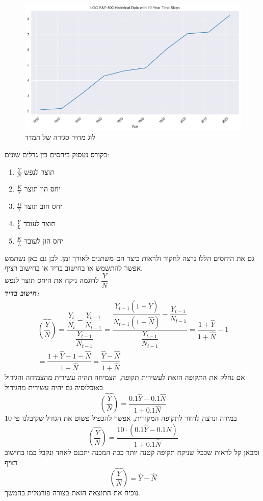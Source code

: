 \documentclass[a4paper,12pt]{article}
\begin{document}
\begin{RTL}
\begin{hebrew}
\begin{figure}[H]
    \centering
    \includegraphics[width=1\linewidth]{LOG S&P500.png}
    \caption{לוג מחיר סגירה של המדד}
\end{figure}
בקורס נעסוק ביחסים בין גדלים שונים:
\begin{enumerate}
    \item $\frac{Y}{N}$ תוצר לנפש
    \item $\frac{K}{Y}$ יחס הון תוצר
    \item $\frac{D}{Y}$ יחס חוב תוצר
    \item $\frac{Y}{L}$ תוצר לעובד
    \item $\frac{K}{L}$ יחס הון לעובד
\end{enumerate}
גם את היחסים הללו נרצה לחקור ולראות כיצד הם משתנים לאורך זמן. לכן גם כאן נשתמש אפשר להתשמש או בחישוב בדיד או בחישוב רציף.
\\
לדוגמה ניקח את היחס תוצר לנפש $\dfrac{Y}{N}$ \\
\textbf{\textit{חישוב בדיד:}}
\begin{multline*}
\widehat{\left(\dfrac{{Y}}{N}\right)} =\dfrac{\dfrac{Y_t}{N_t}-\dfrac{Y_{t-1}}{N_{t-1}}}{\dfrac{Y_{t-1}}{N_{t-1}}}=\dfrac{\dfrac{Y_{t-1}(1+\widehat{Y})}{N_{t-1}(1+\widehat{N})}-\dfrac{Y_{t-1}}{N_{t-1}}}{\dfrac{Y_{t-1}}{N_{t-1}}}=\dfrac{1+\widehat{Y}}{1+\widehat{N}}-1 \\
= \dfrac{1+\widehat{Y}-1-\widehat{N}}{1+\widehat{N}}=\dfrac{\widehat{Y}-\widehat{N}}{1+\widehat{N}}
\end{multline*}
אם נחלק את התקופה הזאת לעשירית תקופה, הצמיחה תהיה עשירית מהצמיחה והגידול באוכלוסיה גם יהיה עשירית מהגידול
\begin{equation*}
    \widehat{\left(\frac{Y}{N}\right)}
    = \dfrac{0.1\widehat Y - 0.1 \widehat N} {1 + 0.1\widehat N}
\end{equation*}
במידה ונרצה לחזור לתקופה המקורית, אפשר להכפיל פשוט את הגודל שקיבלנו פי 10
\begin{equation*}
    \widehat{\left(\frac{Y}{N}\right)}
    = \dfrac{10\cdot(0.1\widehat Y - 0.1 \widehat N)} {1 + 0.1\widehat N}
\end{equation*}
ומכאן קל לראות שככל שניקח תקופה קטנה יותר ככה המכנה יתכנס לאחד ונקבל כמו בחישוב רציף
\begin{equation*}
    \widehat{\left(\frac{Y}{N}\right) }= \widehat Y - \widehat N
\end{equation*}
נוכיח את התוצאה הזאת בצורה פורמלית בהמשך.
\newpage


\end{hebrew}
\end{RTL}
\end{document}
